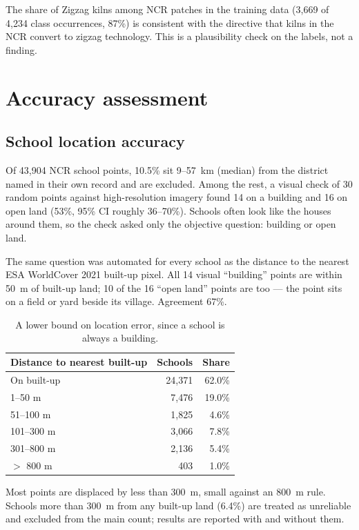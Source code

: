 \documentclass[11pt,a4paper]{article}
\begin{document}
The share of Zigzag kilns among NCR patches in the training data (3{,}669 of
4{,}234 class occurrences, 87\%) is consistent with the directive that kilns in
the NCR convert to zigzag technology. This is a plausibility check on the labels,
not a finding.

\section{Accuracy assessment}\label{sec:accuracy}


\subsection{School location accuracy}
Of 43{,}904 NCR school points, 10.5\% sit 9--57~km (median) from the district
named in their own record and are excluded. Among the rest, a visual check of 30
random points against high-resolution imagery found 14 on a building and 16 on
open land (53\%, 95\% CI roughly 36--70\%). Schools often look like the houses
around them, so the check asked only the objective question: building or open
land.

The same question was automated for every school as the distance to the
nearest ESA WorldCover 2021 built-up pixel. All 14 visual ``building'' points
are within 50~m of built-up land; 10 of the 16 ``open land'' points are too ---
the point sits on a field or yard beside its village. Agreement 67\%.

\begin{table}[H]
\centering\small
\begin{tabular}{@{}lrr@{}}
\toprule
Distance to nearest built-up & Schools & Share \\
\midrule
On built-up & 24{,}371 & 62.0\% \\
1--50 m     &  7{,}476 & 19.0\% \\
51--100 m   &  1{,}825 &  4.6\% \\
101--300 m  &  3{,}066 &  7.8\% \\
301--800 m  &  2{,}136 &  5.4\% \\
$>$ 800 m   &    403   &  1.0\% \\
\bottomrule
\end{tabular}
\caption{A lower bound on location error, since a school is always a building.}
\end{table}

Most points are displaced by less than 300~m, small against an 800~m rule.
Schools more than 300~m from any built-up land (6.4\%) are treated as
unreliable and excluded from the main count; results are reported with and
without them.
\end{document}
